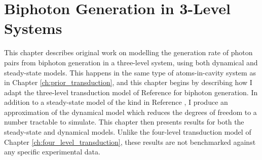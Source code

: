\chapter{\label{ch:biphoton_generation}Biphoton Generation in 3-Level Systems}

This chapter describes original work on modelling the generation rate of photon pairs from biphoton generation in a three-level system, using both dynamical and steady-state models. This happens in the same type of atoms-in-cavity system as in Chapter \ref{ch:prior_transduction}, and this chapter begins by describing how I adapt the three-level transduction model of Reference \cite{barnett_longdell_2020} for biphoton generation. In addition to a steady-state model of the kind in Reference \cite{barnett_longdell_2020}, I produce an approximation of the dynamical model which reduces the degrees of freedom to a number tractable to simulate. This chapter then presents results for both the steady-state and dynamical models. Unlike the four-level transduction model of Chapter \ref{ch:four_level_transduction}, these results are not benchmarked against any specific experimental data.

